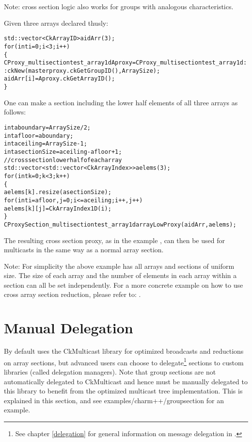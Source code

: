 Note: cross section logic also works for groups with analogous characteristics.

Given three arrays declared thusly:

\begin{alltt}
	  std::vector<CkArrayID> aidArr(3);
	  for (int i=0; i<3; i++)
	    \{
	      CProxy\_multisectiontest\_array1d Aproxy = CProxy\_multisectiontest\_array1d::ckNew(masterproxy.ckGetGroupID(), ArraySize);
	      aidArr[i] = Aproxy.ckGetArrayID();
	    \}
\end{alltt}

One can make a section including the  lower half elements of all three
arrays as follows:

\begin{alltt}
	  int aboundary = ArraySize/2;
	  int afloor = aboundary;
	  int aceiling = ArraySize-1;
	  int asectionSize = aceiling-afloor+1;
	  // cross section lower half of each array
	  std::vector<std::vector<CkArrayIndex> > aelems(3);
	  for (int k=0; k<3; k++)
	    \{
	      aelems[k].resize(asectionSize);
	      for (int i=afloor,j=0; i<=aceiling; i++,j++)
	        aelems[k][j] = CkArrayIndex1D(i);
	    \}
	  CProxySection\_multisectiontest\_array1d arrayLowProxy(aidArr, aelems);
\end{alltt}

The resulting cross section proxy, as in the example ,
can then be used for multicasts in the same way as a normal array
section.

Note: For simplicity the above example has all arrays and sections of uniform
size.  The size of each array and the number of elements in each array
within a section can all be set independently.
For a more concrete example on how to use cross array section reduction,
please refer to: .




\section{Manual Delegation}
\label{Manual Delegation}

By default \charmpp{} uses the CkMulticast library for optimized broadcasts and
reductions on array sections, but advanced \charmpp{} users can choose to
delegate\footnote{See chapter \ref{delegation} for general information on message delegation in \charmpp{}.}
sections to custom libraries (called delegation managers).
Note that group sections are not automatically
delegated to CkMulticast and hence must be manually delegated to this library
to benefit from the optimized multicast tree implementation.
This is explained in this section, and see examples/charm++/groupsection for an example.

